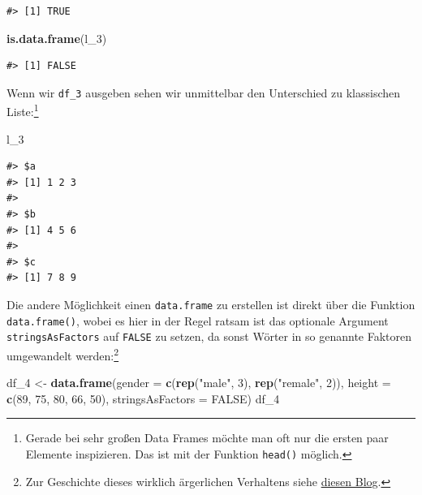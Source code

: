 \documentclass[]{tufte-book}
\newenvironment{Shaded}{}{}
\newcommand{\KeywordTok}[1]{\textcolor[rgb]{0.00,0.44,0.13}{\textbf{#1}}}
\newcommand{\DataTypeTok}[1]{\textcolor[rgb]{0.56,0.13,0.00}{#1}}
\newcommand{\DecValTok}[1]{\textcolor[rgb]{0.25,0.63,0.44}{#1}}
\newcommand{\StringTok}[1]{\textcolor[rgb]{0.25,0.44,0.63}{#1}}
\newcommand{\OtherTok}[1]{\textcolor[rgb]{0.00,0.44,0.13}{#1}}
\newcommand{\NormalTok}[1]{#1}
\begin{document}
\begin{verbatim}
#> [1] TRUE
\end{verbatim}

\begin{Shaded}
\begin{Highlighting}[]
\KeywordTok{is.data.frame}\NormalTok{(l_}\DecValTok{3}\NormalTok{)}
\end{Highlighting}
\end{Shaded}

\begin{verbatim}
#> [1] FALSE
\end{verbatim}

Wenn wir \texttt{df\_3} ausgeben sehen wir unmittelbar den Unterschied
zu klassischen Liste:\footnote{Gerade bei sehr großen Data Frames möchte
  man oft nur die ersten paar Elemente inspizieren. Das ist mit der
  Funktion \texttt{head()} möglich.}

\begin{Shaded}
\begin{Highlighting}[]
\NormalTok{l_}\DecValTok{3}
\end{Highlighting}
\end{Shaded}

\begin{verbatim}
#> $a
#> [1] 1 2 3
#> 
#> $b
#> [1] 4 5 6
#> 
#> $c
#> [1] 7 8 9
\end{verbatim}

Die andere Möglichkeit einen \texttt{data.frame} zu erstellen ist direkt
über die Funktion \texttt{data.frame()}, wobei es hier in der Regel
ratsam ist das optionale Argument \texttt{stringsAsFactors} auf
\texttt{FALSE} zu setzen, da sonst Wörter in so genannte Faktoren
umgewandelt werden:\footnote{Zur Geschichte dieses wirklich ärgerlichen
  Verhaltens siehe
  \href{https://simplystatistics.org/2015/07/24/stringsasfactors-an-unauthorized-biography/}{diesen
  Blog}.}

\begin{Shaded}
\begin{Highlighting}[]
\NormalTok{df_}\DecValTok{4}\NormalTok{ <-}\StringTok{ }\KeywordTok{data.frame}\NormalTok{(}\DataTypeTok{gender =} \KeywordTok{c}\NormalTok{(}\KeywordTok{rep}\NormalTok{(}\StringTok{"male"}\NormalTok{, }\DecValTok{3}\NormalTok{), }
    \KeywordTok{rep}\NormalTok{(}\StringTok{"remale"}\NormalTok{, }\DecValTok{2}\NormalTok{)), }\DataTypeTok{height =} \KeywordTok{c}\NormalTok{(}\DecValTok{89}\NormalTok{, }\DecValTok{75}\NormalTok{, }\DecValTok{80}\NormalTok{, }
    \DecValTok{66}\NormalTok{, }\DecValTok{50}\NormalTok{), }\DataTypeTok{stringsAsFactors =} \OtherTok{FALSE}\NormalTok{)}
\NormalTok{df_}\DecValTok{4}
\end{Highlighting}
\end{Shaded}
\end{document}
